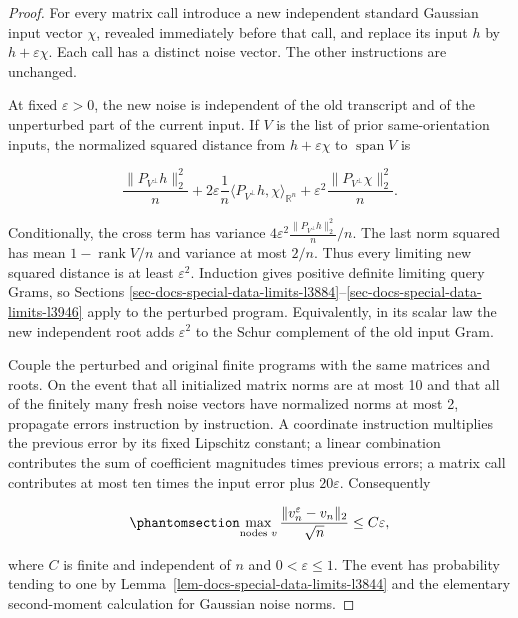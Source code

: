 \documentclass[
  11pt,
]{article}
\theoremstyle{definition}
\theoremstyle{plain}
\theoremstyle{plain}
\theoremstyle{plain}
\theoremstyle{remark}
\begin{document}
\begin{proof}
For every matrix call introduce a new independent standard Gaussian
input vector \(\chi\), revealed immediately before that call, and
replace its input \(h\) by \(h+\varepsilon\chi\). Each call has a
distinct noise vector. The other instructions are unchanged.

At fixed \(\varepsilon>0\), the new noise is independent of the old
transcript and of the unperturbed part of the current input. If \(V\) is
the list of prior same-orientation inputs, the normalized squared
distance from \(h+\varepsilon\chi\) to \(\operatorname{span}V\) is

\[
\frac{\|P_{V^\perp}h\|_2^2}{n}
 +2\varepsilon\frac{1}{n}\langle P_{V^\perp}h,\chi\rangle_{\mathbb R^n}
 +\varepsilon^2\frac{\|P_{V^\perp}\chi\|_2^2}{n}.
\]

Conditionally, the cross term has variance
\(4\varepsilon^2\frac{\|P_{V^\perp}h\|_2^2}{n}/n\). The last norm
squared has mean \(1-\operatorname{rank}V/n\) and variance at most
\(2/n\). Thus every limiting new squared distance is at least
\(\varepsilon^2\). Induction gives positive definite limiting query
Grams, so Sections
\ref{sec-docs-special-data-limits-l3884}--\ref{sec-docs-special-data-limits-l3946}
apply to the perturbed program. Equivalently, in its scalar law the new
independent root adds \(\varepsilon^2\) to the Schur complement of the
old input Gram.

Couple the perturbed and original finite programs with the same matrices
and roots. On the event that all initialized matrix norms are at most 10
and that all of the finitely many fresh noise vectors have normalized
norms at most 2, propagate errors instruction by instruction. A
coordinate instruction multiplies the previous error by its fixed
Lipschitz constant; a linear combination contributes the sum of
coefficient magnitudes times previous errors; a matrix call contributes
at most ten times the input error plus \(20\varepsilon\). Consequently

\begin{equation}\protect\phantomsection\label{eq-docs-special-data-limits-l4024}{
\max_{\text{nodes }v}\frac{\|v_n^\varepsilon-v_n\|_2}{\sqrt n}
\le C\varepsilon,
}\end{equation}

where \(C\) is finite and independent of \(n\) and
\(0<\varepsilon\le1\). The event has probability tending to one by
Lemma~\ref{lem-docs-special-data-limits-l3844} and the elementary
second-moment calculation for Gaussian noise norms.


\end{proof}
\end{document}
